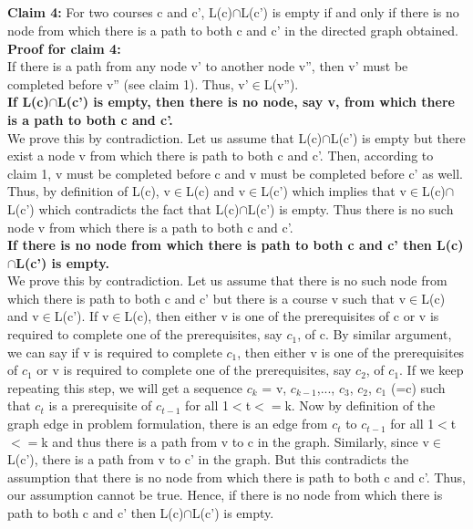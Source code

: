 \documentclass{article}
\begin{document}
\subsection{}
\textbf{Claim 4:} For two courses c and c', L(c)$\cap$L(c') is empty if and only if there is no node from which there is a path to both c and c' in the directed graph obtained.\\
\textbf{Proof for claim 4:}\\
If there is a path from any node v' to another node v'', then v' must be completed before v'' (see claim 1). Thus, v'$\in$L(v'').\\
\textbf{If L(c)$\cap$L(c') is empty, then there is no node, say v, from which there is a path to both c and c'.}\\
We prove this by contradiction. Let us assume that L(c)$\cap$L(c') is empty but there exist a node v from which there is path to both c and c'. Then, according to claim 1, v must be completed before c and v must be completed before c' as well. Thus, by definition of L(c), v$\in$L(c) and v$\in$L(c') which implies that v$\in$L(c)$\cap$L(c') which contradicts the fact that L(c)$\cap$L(c') is empty. Thus there is no such node v from which there is a path to both c and c'.\\
\textbf{If there is no node from which there is path to both c and c' then L(c)$\cap$L(c') is empty.}\\
We prove this by contradiction. Let us assume that there is no such node from which there is path to both c and c' but there is a course v such that v$\in$L(c) and v$\in$L(c'). If v$\in$L(c), then either v is one of the prerequisites of c or v is required to complete one of the prerequisites, say $c_1$, of c. By similar argument, we can say if v is required to complete $c_1$, then either v is one of the prerequisites of $c_1$ or v is required to complete one of the prerequisites, say $c_2$, of $c_1$. If we keep repeating this step, we will get a sequence  $c_k$ = v, $c_{k-1}$,..., $c_3$, $c_2$, $c_1$ (=c) such that $c_t$ is a prerequisite of $c_{t-1}$ for all 1$<$t$<=$k. Now by definition of the graph edge in problem formulation, there is an edge from $c_t$ to $c_{t-1}$ for all 1$<$t$<=$k and thus there is a path from v to c in the graph. Similarly, since v$\in$L(c'), there is a path from v to c' in the graph. But this contradicts the assumption that there is no node from which there is path to both c and c'. Thus, our assumption cannot be true. Hence, if there is no node from which there is path to both c and c' then L(c)$\cap$L(c') is empty.\\
\end{document}
